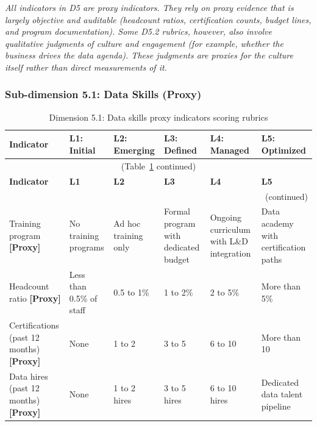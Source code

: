 \noindent \textit{All indicators in D5 are proxy indicators. They rely on proxy evidence that is largely objective and auditable (headcount ratios, certification counts, budget lines, and program documentation). Some D5.2 rubrics, however, also involve qualitative judgments of culture and engagement (for example, whether the business drives the data agenda). These judgments are proxies for the culture itself rather than direct measurements of it.}

\subsubsection*{Sub-dimension 5.1: Data Skills (Proxy)}

\begin{center}
{\small
\begin{longtable}{|p{2.4cm}|p{2.0cm}|p{2.0cm}|p{2.2cm}|p{2.2cm}|p{2.2cm}|}
\caption{Dimension 5.1: Data skills proxy indicators scoring rubrics}\label{tab:d5-1}\\

\hline
\textbf{Indicator} & \textbf{L1: Initial} & \textbf{L2: Emerging} & \textbf{L3: Defined} & \textbf{L4: Managed} & \textbf{L5: Optimized} \\
\hline
\endfirsthead
\multicolumn{6}{c}{\small (Table~\ref{tab:d5-1} continued)} \\
\hline
\textbf{Indicator} & \textbf{L1} & \textbf{L2} & \textbf{L3} & \textbf{L4} & \textbf{L5} \\
\hline
\endhead
\hline
\multicolumn{6}{r}{\small (continued)} \\
\endfoot
\hline
\endlastfoot
Training program \textbf{[Proxy]} &
  No training programs &
  Ad hoc training only &
  Formal program with dedicated budget &
  Ongoing curriculum with L\&D integration &
  Data academy with certification paths \\
\hline
Headcount ratio \textbf{[Proxy]} &
  Less than 0.5\% of staff &
  0.5 to 1\% &
  1 to 2\% &
  2 to 5\% &
  More than 5\% \\
\hline
Certifications (past 12 months) \textbf{[Proxy]} &
  None &
  1 to 2 &
  3 to 5 &
  6 to 10 &
  More than 10 \\
\hline
Data hires (past 12 months) \textbf{[Proxy]} &
  None &
  1 to 2 hires &
  3 to 5 hires &
  6 to 10 hires &
  Dedicated data talent pipeline \\
\hline
\end{longtable}
}
\end{center}

